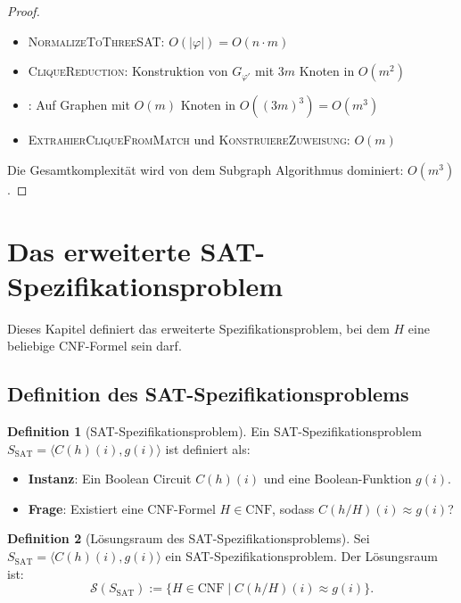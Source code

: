 ﻿\documentclass[a4paper,12pt]{article}
\theoremstyle{definition}
\newtheorem{definition}{Definition}
\begin{document}
\begin{proof}
    \begin{itemize}
        \item[-] \textsc{NormalizeToThreeSAT}: $O(|\varphi|) = O(n \cdot m)$
        \item[-] \textsc{CliqueReduction}: Konstruktion von $G_{\varphi'}$ mit $3m$ Knoten in $O(m^2)$
        \item[-] : Auf Graphen mit $O(m)$ Knoten in $O((3m)^3) = O(m^3)$
        \item[-] \textsc{ExtrahierCliqueFromMatch} und \textsc{KonstruiereZuweisung}: $O(m)$
    \end{itemize}
    Die Gesamtkomplexität wird von dem Subgraph Algorithmus dominiert: $O(m^3)$.
\end{proof}

\section{Das erweiterte SAT-Spezifikationsproblem}

Dieses Kapitel definiert das erweiterte Spezifikationsproblem, bei dem $H$ eine beliebige CNF-Formel sein darf.

\subsection{Definition des SAT-Spezifikationsproblems}

\begin{definition}[SAT-Spezifikationsproblem]
    Ein SAT-Spezifikationsproblem $S_{\text{SAT}} = \langle C(h)(i), g(i) \rangle$ ist definiert als:
    \begin{itemize}
        \item \textbf{Instanz}: Ein Boolean Circuit $C(h)(i)$ und eine Boolean-Funktion $g(i)$.
        \item \textbf{Frage}: Existiert eine CNF-Formel $H \in \text{CNF}$, sodass $C(h/H)(i) \approx g(i)$?
    \end{itemize}
\end{definition}

\begin{definition}[Lösungsraum des SAT-Spezifikationsproblems]
    Sei $S_{\text{SAT}} = \langle C(h)(i), g(i) \rangle$ ein SAT-Spezifikationsproblem. Der Lösungsraum ist:
    \[
    \mathcal{S}(S_{\text{SAT}}) := \{ H \in \text{CNF} \mid C(h/H)(i) \approx g(i) \}.
    \]
\end{definition}
\end{document}
